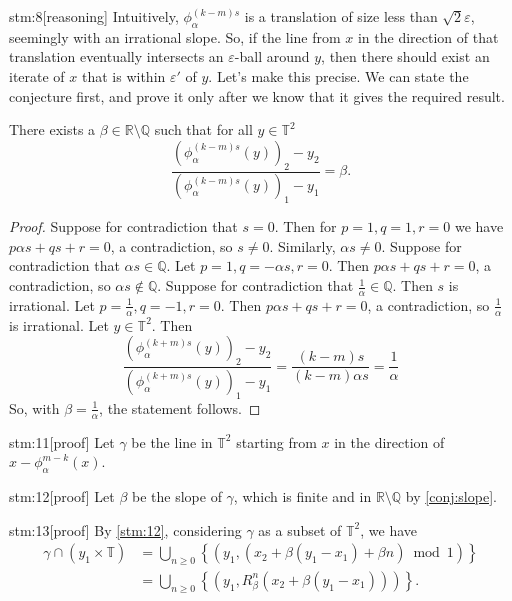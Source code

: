 \begin{stm}{stm:8}[reasoning]
Intuitively, $\phi_\alpha^{(k-m)s}$ is a translation of size less than $\sqrt{2} \varepsilon$, seemingly with an irrational slope. So, if the line from $x$ in the direction of that translation eventually intersects an $\varepsilon$-ball around $y$, then there should exist an iterate of $x$ that is within $\varepsilon'$ of $y$. Let's make this precise. We can state the conjecture first, and prove it only after we know that it gives the required result.
\end{stm}

\begin{conj}\label{conj:slope}
There exists a  $\beta \in \mathbb{R} \setminus \mathbb{Q}$ such that for all $y \in \mathbb{T}^2$
\[
\frac{(\phi_\alpha^{(k-m)s}(y))_2 - y_2}{(\phi_\alpha^{(k-m)s}(y))_1 - y_1} = \beta.
\]
\end{conj}

\begin{proof}
    Suppose for contradiction that $s = 0$. Then for $p = 1, q = 1, r = 0$ we have $p \alpha s + q s + r = 0$, a contradiction, so $s \ne 0$. Similarly, $\alpha s \ne 0$. Suppose for contradiction that $\alpha s \in \mathbb{Q}$. Let $p = 1, q = -\alpha s, r = 0$. Then $p \alpha s + q s + r = 0$, a contradiction, so $\alpha s \not\in \mathbb{Q}$. Suppose for contradiction that $\frac{1}{\alpha} \in \mathbb{Q}$. Then $s$ is irrational. Let $p = \frac{1}{\alpha}, q = -1, r = 0$. Then $p \alpha s + q s + r = 0$, a contradiction, so $\frac{1}{\alpha}$ is irrational. Let $y \in \mathbb{T}^2$. Then $$\frac{(\phi_\alpha^{(k+m)s}(y))_2 - y_2}{(\phi_\alpha^{(k+m)s}(y))_1 - y_1} = \frac{(k-m)s}{(k-m)\alpha s} = \frac{1}{\alpha}$$
    So, with $\beta = \frac{1}{\alpha}$, the statement follows.
\end{proof}

\begin{stm}{stm:11}[proof]
Let $\gamma$ be the line in $\mathbb{T}^2$ starting from $x$ in the direction of $x - \phi_\alpha^{m-k}(x)$.
\end{stm}

\begin{stm}{stm:12}[proof]
Let $\beta$ be the slope of $\gamma$, which is finite and in $\mathbb{R} \setminus \mathbb{Q}$ by \ref{conj:slope}.
\end{stm}

\begin{stm}{stm:13}[proof]
By \ref{stm:12}, considering $\gamma$ as a subset of $\mathbb{T}^2$, we have
\begin{align*}
\gamma \cap (y_1 \times \mathbb{T})
&= \bigcup_{n \ge 0} \left\{ \left( y_1, (x_2 + \beta(y_1 - x_1) + \beta n) \bmod 1 \right) \right\} \\
&= \bigcup_{n \ge 0} \left\{ \left( y_1, R_\beta^n(x_2 + \beta(y_1 - x_1)) \right) \right\}.
\end{align*}
\end{stm}


